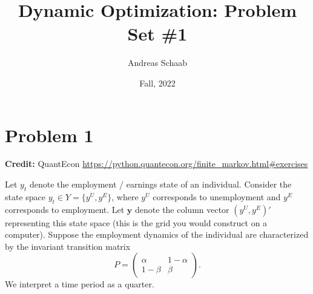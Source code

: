 \documentclass[11pt]{extarticle}
\title{Dynamic Optimization: Problem Set \#1}
\author{Andreas Schaab}
\date{Fall, 2022}
\theoremstyle{plain}
\theoremstyle{definition}
\begin{document}
\maketitle
\thispagestyle{empty}
\setcounter{page}{0}



\vspace{10mm}
\section*{Problem 1}

\textbf{Credit:} QuantEcon \url{https://python.quantecon.org/finite_markov.html#exercises}
 
\vspace{5mm}
\noindent
Let $y_t$ denote the employment / earnings state of an individual. Consider the state space $y_t \in Y = \{ y^U, y^E \}$, where $y^U$ corresponds to unemployment and $y^E$ corresponds to employment. Let $\bm y$ denote the column vector $(y^U, y^E)'$ representing this state space (this is the grid you would construct on a computer). Suppose the employment dynamics of the individual are characterized by the invariant transition matrix 
\begin{equation*}
	P = \begin{pmatrix} \alpha & 1 - \alpha \\ 1 - \beta & \beta \end{pmatrix}.
\end{equation*}
We interpret a time period as a quarter. 
\end{document}
